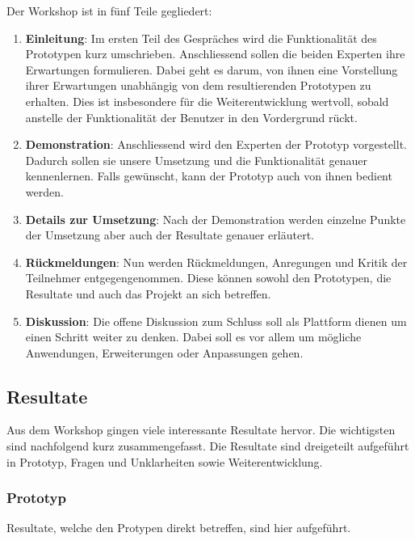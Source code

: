 Der Workshop ist in fünf Teile gegliedert:
\begin{enumerate}
    \item \textbf{Einleitung}: Im ersten Teil des Gespräches wird die Funktionalität des Prototypen kurz umschrieben. Anschliessend sollen die beiden Experten ihre Erwartungen formulieren. Dabei geht es darum, von ihnen eine Vorstellung ihrer Erwartungen unabhängig von dem resultierenden Prototypen zu erhalten. Dies ist insbesondere für die Weiterentwicklung wertvoll, sobald anstelle der Funktionalität der Benutzer in den Vordergrund rückt.
    \item \textbf{Demonstration}: Anschliessend wird den Experten der Prototyp vorgestellt. Dadurch sollen sie unsere Umsetzung und die Funktionalität genauer kennenlernen. Falls gewünscht, kann der Prototyp auch von ihnen bedient werden.
    \item \textbf{Details zur Umsetzung}: Nach der Demonstration werden einzelne Punkte der Umsetzung aber auch der Resultate genauer erläutert.
    \item \textbf{Rückmeldungen}: Nun werden Rückmeldungen, Anregungen und Kritik der Teilnehmer entgegengenommen. Diese können sowohl den Prototypen, die Resultate und auch das Projekt an sich betreffen.
    \item \textbf{Diskussion}: Die offene Diskussion zum Schluss soll als Plattform dienen um einen Schritt weiter zu denken. Dabei soll es vor allem um mögliche Anwendungen, Erweiterungen oder Anpassungen gehen.
\end{enumerate}

\subsection{Resultate}

Aus dem Workshop gingen viele interessante Resultate hervor. Die wichtigsten sind nachfolgend kurz zusammengefasst. Die Resultate sind dreigeteilt aufgeführt in Prototyp, Fragen und Unklarheiten sowie Weiterentwicklung.

\subsubsection{Prototyp}
Resultate, welche den Protypen direkt betreffen, sind hier aufgeführt.

